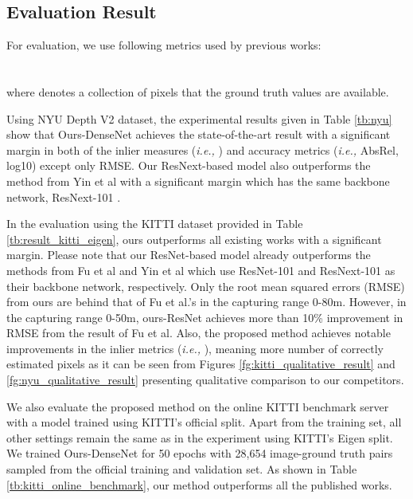 \documentclass[10pt,twocolumn,letterpaper]{article}
\begin{document}
\subsection{Evaluation Result}
For evaluation, we use following metrics used by previous works:\\

 \\

 \\


where  denotes a collection of pixels that the ground truth values are available.

Using NYU Depth V2 dataset, the experimental results given in Table \ref{tb:nyu} show that Ours-DenseNet achieves the state-of-the-art result with a significant margin in both of the inlier measures (\textit{i.e.,} ) and accuracy metrics (\textit{i.e.,} AbsRel, log10) except only RMSE. Our ResNext-based model also outperforms the method from Yin et al \cite{yin2019enforcing} with a significant margin which has the same backbone network, ResNext-101 \cite{xie2017cvpr}.

In the evaluation using the KITTI dataset provided in Table \ref{tb:result_kitti_eigen}, ours outperforms all existing works with a significant margin.
Please note that our ResNet-based model already outperforms the methods from Fu et al \cite{fu2018deep} and Yin et al \cite{yin2019enforcing} which use ResNet-101 and ResNext-101 \cite{xie2017cvpr} as their backbone network, respectively.
Only the root mean squared errors (RMSE) from ours are behind that of Fu et al.'s in the capturing range 0-80m.
However, in the capturing range 0-50m, ours-ResNet achieves more than 10\% improvement in RMSE from the result of Fu et al.
Also, the proposed method achieves notable improvements in the inlier metrics (\textit{i.e.,} ), meaning more number of correctly estimated pixels as it can be seen from Figures \ref{fg:kitti_qualitative_result} and \ref{fg:nyu_qualitative_result} presenting qualitative comparison to our competitors.



We also evaluate the proposed method on the online KITTI benchmark server with a model trained using KITTI's official split.
Apart from the training set, all other settings remain the same as in the experiment using KITTI's Eigen split.
We trained Ours-DenseNet for 50 epochs with 28,654 image-ground truth pairs sampled from the official training and validation set.
As shown in Table \ref{tb:kitti_online_benchmark}, our method outperforms all the published works.
\end{document}
